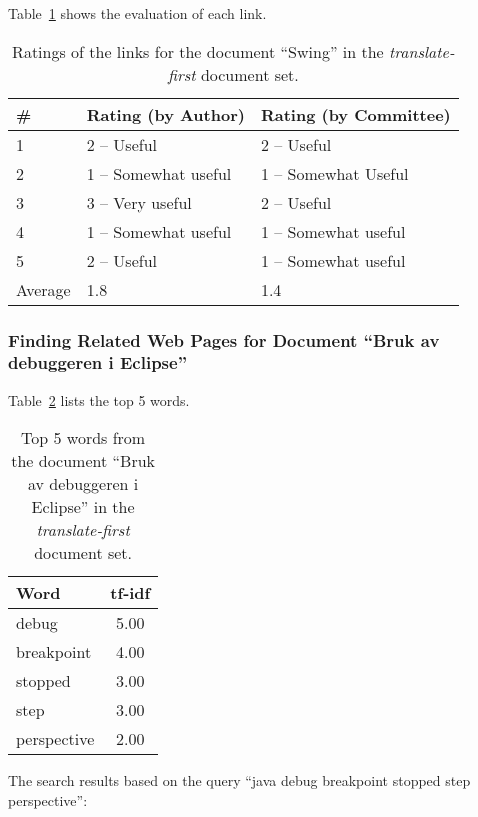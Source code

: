 Table~\ref{tab:ratings-en-swing-2} shows the evaluation of each link.
\begin{table}[H]
\centering
\begin{tabular}{|l|l|l|}
\hline\hline
    \# & Rating (by Author) & Rating (by Committee) \\
\hline
    1 & 2 -- Useful & 2 -- Useful \\
    2 & 1 -- Somewhat useful & 1 -- Somewhat Useful \\
    3 & 3 -- Very useful & 2 -- Useful \\
    4 & 1 -- Somewhat useful & 1 -- Somewhat useful \\
    5 & 2 -- Useful & 1 -- Somewhat useful \\
\hline
    Average & 1.8 & 1.4 \\
\hline\hline
\end{tabular}
\caption{Ratings of the links for the document ``Swing'' in the \textit{translate-first} document set.}
\label{tab:ratings-en-swing-2}
\end{table}


\subsubsection{Finding Related Web Pages for Document ``Bruk av debuggeren i Eclipse''}
\label{subsubsec:no-bruk-av-debuggeren-i-eclipse-2}

Table~\ref{tab:topWords-en-bruk-av-debuggeren-i-eclipse-2} lists the top 5 words.
\begin{table}[H]
\centering
\begin{tabular}{|l|c|}
\hline\hline
    Word & tf-idf \\
\hline
    debug & 5.00 \\
    breakpoint & 4.00 \\
    stopped & 3.00 \\
    step & 3.00 \\
    perspective & 2.00 \\
\hline\hline
\end{tabular}
\caption{Top 5 words from the document ``Bruk av debuggeren i Eclipse'' in the \textit{translate-first} document set.}
\label{tab:topWords-en-bruk-av-debuggeren-i-eclipse-2}
\end{table}

The search results based on the query ``java debug breakpoint stopped step perspective'':

